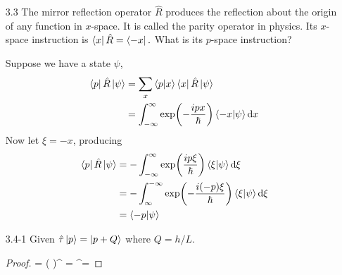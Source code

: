 \begin{enumerate}
\begin{proof}
\begin{align*}
    \end{align*}
    yielding the equation
    \begin{align*}
      \int_{-\infty}^{\infty} \exp(\frac{-ipx}{\hbar}) \dv{x} \bra{x} \dd{x}
      &= \exp(-\frac{ipx}{\hbar}) \bra{x} \bigg\rvert_{-\infty}^{\infty} - \int_{-\infty}^{\infty} -\frac{ip}{\hbar} \exp(\frac{-ipx}{\hbar}) \bra{x} \dd{x} \\
      &= \exp(-\frac{ipx}{\hbar}) \bra{x} \bigg\rvert_{-\infty}^{\infty} + \frac{ip}{\hbar} \int_{-\infty}^{\infty} \exp(\frac{-ipx}{\hbar}) \bra{x} \dd{x}
    \end{align*}
    As $\lim_{x \to \pm \infty} \exp(-ipx/\hbar) = 0$, both terms simplify to
    \begin{align*}
      \bra{p} \hat{D} &= \frac{ip}{\hbar} \bra{p}.
    \end{align*}
  \end{proof}
\item[3.3] The mirror reflection operator $\hat{R}$ produces the reflection about the
  origin of any function in $x$-space. It is called the parity operator in physics.
  Its $x$-space instruction is $\bra{x} \hat{R} = \bra{-x}.$ What is its $p$-space
  instruction?

    Suppose we have a state $\psi$,
    \begin{align*}
      \bra{p} \hat{R} \ket{\psi}
      &= \sum_x \braket{p}{x} \bra{x} \hat{R} \ket{\psi} \\
      &= \int_{-\infty}^{\infty} \exp(-\frac{ipx}{\hbar}) \braket{-x}{\psi} \dd{x}
    \end{align*}
    Now let $\xi = -x$, producing
    \begin{align*}
      \bra{p} \hat{R} \ket{\psi}
      &= -\int_{-\infty}^{\infty} \exp(\frac{ip\xi}{\hbar}) \braket{\xi}{\psi} \dd{\xi} \\
      &= -\int_{\infty}^{-\infty} \exp(-\frac{i(-p)\xi}{\hbar}) \braket{\xi}{\psi} \dd{\xi} \\
      &= \braket{-p}{\psi}
    \end{align*}
  \item[3.4-1] Given $\hat{\tau} \ket{p} = \ket{p + Q}$ where $Q = h/L$.
    \begin{proof}
       \hat{\tau} = (\hat{\tau} )^\star
      =  \hat{\tau}^\dagger = 
    \end{proof}


\end{enumerate}
